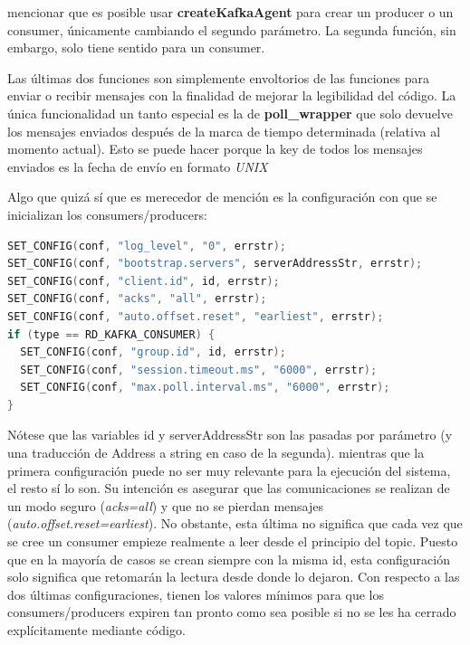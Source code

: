 \documentclass[a4paper,12pt]{article}
\begin{document}
\begin{itemize}
        mencionar que es posible usar \textbf{createKafkaAgent} para crear un producer o un consumer, únicamente cambiando el segundo parámetro. La segunda función,
        sin embargo, solo tiene sentido para un consumer. \par
        Las últimas dos funciones son simplemente envoltorios de las funciones para enviar o recibir mensajes con la finalidad de mejorar la legibilidad del código.
        La única funcionalidad un tanto especial es la de \textbf{poll\_wrapper} que solo devuelve los mensajes enviados después de la
        marca de tiempo determinada (relativa al momento actual). Esto se puede hacer porque la key de todos los mensajes enviados
        es la fecha de envío en formato \textit{UNIX} \par
        Algo que quizá sí que es merecedor de mención es la configuración con que se inicializan los consumers/producers:
        \begin{lstlisting}[language=C]
SET_CONFIG(conf, "log_level", "0", errstr);
SET_CONFIG(conf, "bootstrap.servers", serverAddressStr, errstr);
SET_CONFIG(conf, "client.id", id, errstr);
SET_CONFIG(conf, "acks", "all", errstr);
SET_CONFIG(conf, "auto.offset.reset", "earliest", errstr);
if (type == RD_KAFKA_CONSUMER) {
  SET_CONFIG(conf, "group.id", id, errstr);
  SET_CONFIG(conf, "session.timeout.ms", "6000", errstr);
  SET_CONFIG(conf, "max.poll.interval.ms", "6000", errstr);
}
        \end{lstlisting}
        Nótese que las variables id y serverAddressStr son las pasadas por parámetro (y una traducción de Address a string en caso de la segunda).
        mientras que la primera configuración puede no ser muy relevante para la ejecución del sistema, el resto sí lo son. Su intención es
        asegurar que las comunicaciones se realizan de un modo seguro (\textit{acks=all}) y que no se pierdan mensajes (\textit{auto.offset.reset=earliest}).
        No obstante, esta última no significa que cada vez que se cree un consumer empieze realmente a leer desde el principio del topic. Puesto que en la mayoría
        de casos se crean siempre con la misma id, esta configuración solo significa que retomarán la lectura desde donde lo dejaron. Con respecto a las dos últimas
        configuraciones, tienen los valores mínimos para que los consumers/producers expiren tan pronto como sea posible si no se les ha cerrado
        explícitamente mediante código.
\end{itemize}
\end{document}
